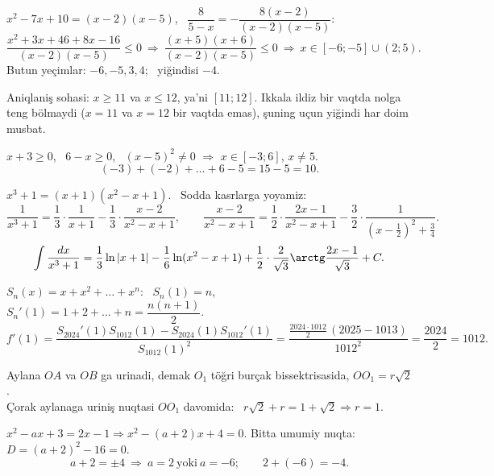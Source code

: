 $x^2-7x+10=(x-2)(x-5)$, \ $\dfrac8{5-x}=-\dfrac{8(x-2)}{(x-2)(x-5)}$:
\[\frac{x^2+3x+46+8x-16}{(x-2)(x-5)}\le0\ \Rightarrow\ \frac{(x+5)(x+6)}{(x-2)(x-5)}\le0\ \Rightarrow\ x\in[-6;-5]\cup(2;5).\]
Butun yeçimlar: $-6,-5,3,4$; \ yiğindisi $-4$.

Aniqlaniş sohasi: $x\ge11$ va $x\le12$, ya'ni $[11;12]$. Ikkala ildiz bir vaqtda nolga teng bölmaydi ($x=11$ va $x=12$ bir vaqtda emas), şuning uçun yiğindi har doim musbat.

$x+3\ge0$, \ $6-x\ge0$, \ $(x-5)^2\ne0$ $\Rightarrow$ $x\in[-3;6]$, $x\ne5$.
\[(-3)+(-2)+\dots+6-5=15-5=10.\]

$x^3+1=(x+1)(x^2-x+1)$. \ Sodda kasrlarga yoyamiz:
\[\frac1{x^3+1}=\frac13\cdot\frac1{x+1}-\frac13\cdot\frac{x-2}{x^2-x+1},\qquad \frac{x-2}{x^2-x+1}=\frac12\cdot\frac{2x-1}{x^2-x+1}-\frac32\cdot\frac1{\left(x-\frac12\right)^2+\frac34}.\]
\[\int\frac{dx}{x^3+1}=\frac13\ln|x+1|-\frac16\ln(x^2-x+1)+\frac12\cdot\frac2{\sqrt3}\arctg\frac{2x-1}{\sqrt3}+C.\]

$S_n(x)=x+x^2+\dots+x^n$: \ $S_n(1)=n$, \ $S_n'(1)=1+2+\dots+n=\dfrac{n(n+1)}2$.
\[f'(1)=\frac{S_{2024}'(1)S_{1012}(1)-S_{2024}(1)S_{1012}'(1)}{S_{1012}(1)^2}=\frac{\frac{2024\cdot1012}2\,(2025-1013)}{1012^2}=\frac{2024}2=1012.\]

Aylana $OA$ va $OB$ ga urinadi, demak $O_1$ töğri burçak bissektrisasida, $OO_1=r\sqrt2$.\\
Çorak aylanaga uriniş nuqtasi $OO_1$ davomida: \ $r\sqrt2+r=1+\sqrt2\Rightarrow r=1$.

$x^2-ax+3=2x-1\Rightarrow x^2-(a+2)x+4=0$. Bitta umumiy nuqta: $D=(a+2)^2-16=0$.
\[a+2=\pm4\ \Rightarrow\ a=2\ \text{yoki}\ a=-6;\qquad 2+(-6)=-4.\]

